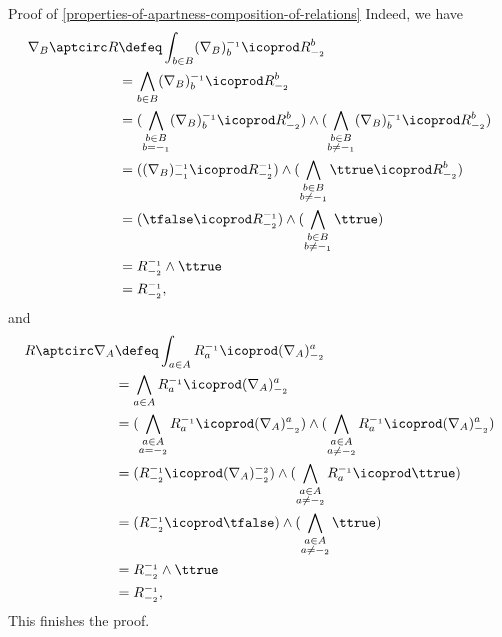 \begin{Proof}{Proof of \cref{properties-of-apartness-composition-of-relations}}
    Indeed, we have
    \begin{align*}
        \nabla_{B}\aptcirc R &\defeq \int_{b\in B}(\nabla_{B})^{-_{1}}_{b}\icoprod R^{b}_{-_{2}}\\
                             &=      \bigwedge_{b\in B}(\nabla_{B})^{-_{1}}_{b}\icoprod R^{b}_{-_{2}}\\
                             &=      (\bigwedge_{\substack{b\in B\\b=-_{1}}}(\nabla_{B})^{-_{1}}_{b}\icoprod R^{b}_{-_{2}})\wedge(\bigwedge_{\substack{b\in B\\b\neq-_{1}}}(\nabla_{B})^{-_{1}}_{b}\icoprod R^{b}_{-_{2}})\\
                             &=      ((\nabla_{B})^{-_{1}}_{-_{1}}\icoprod R^{-_{1}}_{-_{2}})\wedge(\bigwedge_{\substack{b\in B\\b\neq-_{1}}}\ttrue\icoprod R^{b}_{-_{2}})\\
                             &=      (\tfalse\icoprod R^{-_{1}}_{-_{2}})\wedge(\bigwedge_{\substack{b\in B\\b\neq-_{1}}}\ttrue)\\
                             &=      R^{-_{1}}_{-_{2}}\wedge\ttrue\\
                             &=      R^{-_{1}}_{-_{2}},
    \end{align*}
    and
    \begin{align*}
        R\aptcirc\nabla_{A} &\defeq \int_{a\in A}R^{-_{1}}_{a}\icoprod(\nabla_{A})^{a}_{-_{2}}\\
                            &=      \bigwedge_{a\in A}R^{-_{1}}_{a}\icoprod(\nabla_{A})^{a}_{-_{2}}\\
                            &=      (\bigwedge_{\substack{a\in A\\a=-_{2}}}R^{-_{1}}_{a}\icoprod(\nabla_{A})^{a}_{-_{2}})\wedge(\bigwedge_{\substack{a\in A\\a\neq-_{2}}}R^{-_{1}}_{a}\icoprod(\nabla_{A})^{a}_{-_{2}})\\
                            &=      (R^{-_{1}}_{-_{2}}\icoprod(\nabla_{A})^{-_{2}}_{-_{2}})\wedge(\bigwedge_{\substack{a\in A\\a\neq-_{2}}}R^{-_{1}}_{a}\icoprod\ttrue)\\
                            &=      (R^{-_{1}}_{-_{2}}\icoprod\tfalse)\wedge(\bigwedge_{\substack{a\in A\\a\neq-_{2}}}\ttrue)\\
                            &=      R^{-_{1}}_{-_{2}}\wedge\ttrue\\
                            &=      R^{-_{1}}_{-_{2}},
    \end{align*}
    This finishes the proof.


\end{Proof}
